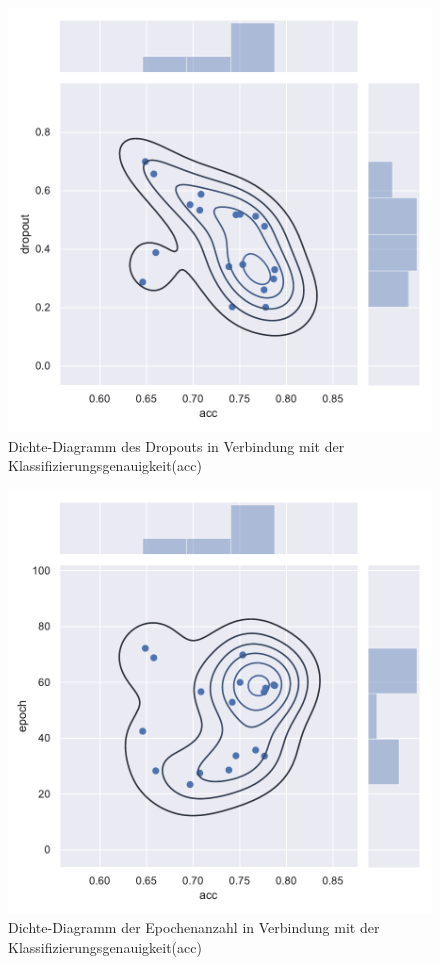 \begin{figure}[H]
  \centering  
  \includegraphics[scale=0.5]{anhang/GA_50_cifar10_False_big_jointplot_dropout.pdf}
  \caption{Dichte-Diagramm des Dropouts in Verbindung mit der Klassifizierungsgenauigkeit(acc)}
  
\end{figure}

\begin{figure}[H]
  \centering  
  \includegraphics[scale=0.5]{anhang/GA_50_cifar10_False_big_jointplot_epoch.pdf}
  \caption{Dichte-Diagramm der Epochenanzahl in Verbindung mit der Klassifizierungsgenauigkeit(acc)}
  
\end{figure}

